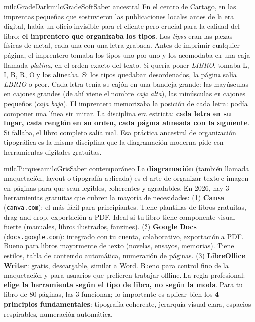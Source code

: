 \documentclass[11pt,letterpaper]{article}
\begin{document}
\begin{softbox}{milcGradeDark}{milcGradeSoft}{Saber ancestral}
En el centro de Cartago, en las imprentas pequeñas que sostuvieron las publicaciones locales antes de la era digital, había un oficio invisible para el cliente pero crucial para la calidad del libro: \textbf{el imprentero que organizaba los tipos}. Los \emph{tipos} eran las piezas físicas de metal, cada una con una letra grabada. Antes de imprimir cualquier página, el imprentero tomaba los tipos uno por uno y los acomodaba en una caja llamada \emph{platina}, en el orden exacto del texto. Si quería poner \emph{LIBRO}, tomaba L, I, B, R, O y los alineaba. Si los tipos quedaban desordenados, la página salía \emph{LBRIO} o peor. Cada letra tenía su cajón en una bandeja grande: las mayúsculas en cajones grandes (de ahí viene el nombre \emph{caja alta}), las minúsculas en cajones pequeños (\emph{caja baja}). El imprentero memorizaba la posición de cada letra: podía componer una línea sin mirar. La disciplina era estricta: \textbf{cada letra en su lugar, cada renglón en su orden, cada página alineada con la siguiente}. Si fallaba, el libro completo salía mal. Esa práctica ancestral de organización tipográfica es la misma disciplina que la diagramación moderna pide con herramientas digitales gratuitas.
\end{softbox}

\begin{softbox}{milcTurquesa}{milcGris}{Saber contemporáneo}
La \textbf{diagramación} (también llamada maquetación, layout o tipografía aplicada) es el arte de organizar texto e imagen en páginas para que sean legibles, coherentes y agradables. En 2026, hay 3 herramientas gratuitas que cubren la mayoría de necesidades: (1) \textbf{Canva} (\texttt{canva.com}): el más fácil para principiantes. Tiene plantillas de libros gratuitas, drag-and-drop, exportación a PDF. Ideal si tu libro tiene componente visual fuerte (manuales, libros ilustrados, fanzines). (2) \textbf{Google Docs} (\texttt{docs.google.com}): integrado con tu cuenta, colaborativo, exportación a PDF. Bueno para libros mayormente de texto (novelas, ensayos, memorias). Tiene estilos, tabla de contenido automática, numeración de páginas. (3) \textbf{LibreOffice Writer}: gratis, descargable, similar a Word. Bueno para control fino de la maquetación y para usuarios que prefieren trabajar offline. La regla profesional: \textbf{elige la herramienta según el tipo de libro, no según la moda}. Para tu libro de 80 páginas, las 3 funcionan; lo importante es aplicar bien los \textbf{4 principios fundamentales}: tipografía coherente, jerarquía visual clara, espacios respirables, numeración automática.
\end{softbox}
\end{document}
